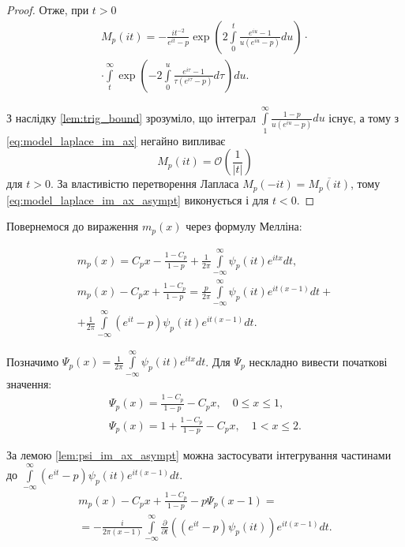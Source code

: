 \begin{lem}
\begin{proof}
Отже, при $t>0$
\begin{equation}
\label{eq:model_laplace_im_ax}
\begin{split}
M_{p}(it) = -\frac{i t^{-2}}{e^{it}-p} \exp \left(2 \int\limits_{0}^{t} \frac{e^{iu} -1}{u(e^{iu} - p)} du\right) \cdot \\
\cdot \int\limits_t^\infty \exp\left(-2 \int\limits_{0}^{u} \frac{e^{i\tau} -1}{\tau(e^{i\tau} - p)} d\tau\right) du.
\end{split}
\end{equation}

З наслідку \eqref{lem:trig_bound} зрозуміло, що інтеграл $\int\limits_{1}^{\infty} \frac{1-p}{u(e^{iu} - p)} du$ існує, а тому з \eqref{eq:model_laplace_im_ax} негайно випливає
\begin{equation}
\label{eq:model_laplace_im_ax_asympt}
M_{p}(it) = \mathcal{O}\left(\frac{1}{|t|}\right)
\end{equation}
для $t > 0$. За властивістю перетворення Лапласа $M_{p}(-it) = \overline{M_{p}(it)}$, тому \eqref{eq:model_laplace_im_ax_asympt} виконується і для $t < 0$.
\end{proof}
\end{lem}

Повернемося до вираження $m_{p}(x)$ через формулу Мелліна:

\begin{gather*}
m_{p}(x) = C_{p} x - \frac{1 - C_p}{1-p} + \frac{1}{2\pi} \int\limits_{-\infty}^{\infty} \psi_{p}(it) e^{itx} dt, \\
m_{p}(x) - C_{p} x + \frac{1 - C_p}{1-p} = \frac{p}{2\pi} \int\limits_{-\infty}^{\infty} \psi_{p}(it) e^{it(x-1)} dt + \\
+ \frac{1}{2\pi} \int\limits_{-\infty}^{\infty} (e^{it} - p) \psi_{p}(it) e^{it(x-1)} dt.
\end{gather*}

Позначимо $\Psi_{p}(x) = \frac{1}{2\pi} \int\limits_{-\infty}^{\infty} \psi_{p}(it) e^{itx} dt$. Для $\Psi_{p}$ нескладно вивести початкові значення:
\begin{equation}
\label{eq:psi_x_initial_values}
\begin{gathered}
\Psi_{p}(x) = \frac{1 - C_p}{1-p} - C_{p} x, \quad 0 \leq x \leq 1, \\
\Psi_{p}(x) = 1 + \frac{1 - C_p}{1-p} - C_{p} x, \quad 1 < x \leq 2.
\end{gathered}
\end{equation}

За лемою \eqref{lem:psi_im_ax_asympt} можна застосувати інтегрування частинами до $\int\limits_{-\infty}^{\infty} (e^{it} - p) \psi_{p}(it) e^{it(x-1)} dt$.
\begin{gather*}
m_{p}(x) - C_{p} x + \frac{1 - C_p}{1-p} - p\Psi_{p}(x-1) = \\
= -\frac{i}{2\pi (x-1)} \int\limits_{-\infty}^{\infty} \frac{\partial}{\partial t}((e^{it} - p) \psi_{p}(it)) e^{it(x-1)} dt.
\end{gather*}

